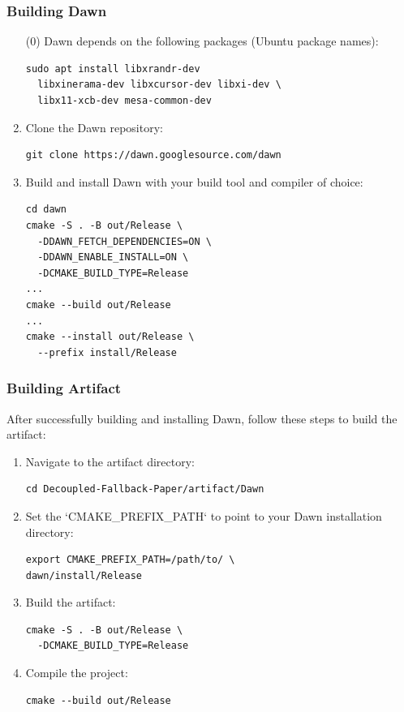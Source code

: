 \documentclass[sigconf]{acmart}
\begin{document}
\subsubsection{Building Dawn}
\begin{enumerate}
  \item[(0)] Dawn depends on the following packages (Ubuntu package names):
  \begin{lstlisting}[basicstyle=\ttfamily\small, frame=single]
sudo apt install libxrandr-dev 
  libxinerama-dev libxcursor-dev libxi-dev \
  libx11-xcb-dev mesa-common-dev
  \end{lstlisting}
  
  \item Clone the Dawn repository:
  \begin{lstlisting}[basicstyle=\ttfamily\small, frame=single]
git clone https://dawn.googlesource.com/dawn
  \end{lstlisting}
  
  \item Build and install Dawn with your build tool and compiler of choice:
  \begin{lstlisting}[basicstyle=\ttfamily\small, frame=single]
cd dawn
cmake -S . -B out/Release \
  -DDAWN_FETCH_DEPENDENCIES=ON \
  -DDAWN_ENABLE_INSTALL=ON \
  -DCMAKE_BUILD_TYPE=Release
...
cmake --build out/Release
...
cmake --install out/Release \
  --prefix install/Release
  \end{lstlisting}
\end{enumerate}

\subsubsection{Building Artifact}
After successfully building and installing Dawn, follow these steps to build the artifact:

\begin{enumerate}
  \item Navigate to the artifact directory:
  \begin{lstlisting}[basicstyle=\ttfamily\small, frame=single]
cd Decoupled-Fallback-Paper/artifact/Dawn
  \end{lstlisting}
  
  \item Set the `CMAKE\_PREFIX\_PATH` to point to your Dawn installation directory:
  \begin{lstlisting}[basicstyle=\ttfamily\small, frame=single]
export CMAKE_PREFIX_PATH=/path/to/ \
dawn/install/Release
  \end{lstlisting}
  
  \item Build the artifact:
  \begin{lstlisting}[basicstyle=\ttfamily\small, frame=single]
cmake -S . -B out/Release \
  -DCMAKE_BUILD_TYPE=Release
  \end{lstlisting}
  
  \item Compile the project:
  \begin{lstlisting}[basicstyle=\ttfamily\small, frame=single]
cmake --build out/Release
  \end{lstlisting}
\end{enumerate}
\end{document}
